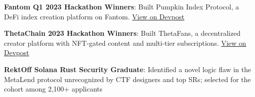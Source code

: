 \documentclass[letter,10pt]{article}
\begin{document}
\begin{zitemize}
  \item \textbf{Fantom Q1 2023 Hackathon Winners}: Built Pumpkin Index Protocol, a DeFi index creation platform on Fantom. \hfill \href{https://devpost.com/software/pumpkin-protocol}{View on Devpost}
  \item \textbf{ThetaChain 2023 Hackathon Winners}: Built ThetaFans, a decentralized creator platform with NFT-gated content and multi-tier subscriptions. \hfill \href{https://devpost.com/software/thetafans}{View on Devpost}
  \item \textbf{RektOff Solana Rust Security Graduate}: Identified a novel logic flaw in the MetaLend protocol unrecognized by CTF designers and top SRs; selected for the cohort among 2,100+ applicants
\end{zitemize}
\end{document}
